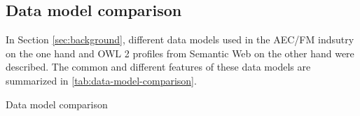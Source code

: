 \subsection{Data model comparison}\label{sec:data-model-comparison}

In Section \ref{sec:background}, different data models used in the AEC/FM indsutry on the one hand and OWL 2 profiles from Semantic Web on the other hand were described.
The common and different features of these data models are summarized in \autoref{tab:data-model-comparison}.


\begin{table*}[t]\footnotesize
    \centering
    \caption{Data model comparison}
    \label{tab:data-model-comparison}
    
    

\end{table*}
